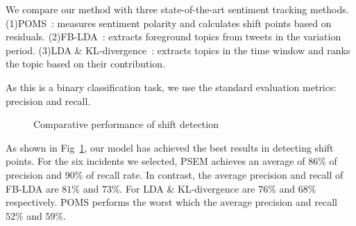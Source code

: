 \documentclass[runningheads]{llncs}
\begin{document}
We compare our method with three state-of-the-art sentiment tracking methods. (1)POMS~\cite{Bollen2011sentimentchange}: measures sentiment polarity and calculates shift points based on residuals. (2)FB-LDA~\cite{Tan2014topic}:  extracts foreground topics from tweets in the variation period. (3)LDA \& KL-divergence~\cite{Giachanou2016sentichange}: extracts topics in the time window and ranks the topic based on their contribution.

As this is a  binary classification task, we use the standard evaluation metrics:  precision and recall. 
\vspace{-0.8cm}
\begin{figure}
\centering
{}
\hspace{-4ex}
\setlength{\abovecaptionskip}{-0.1cm}
\caption{Comparative performance of shift detection}\label{fig:shift}
\end{figure}


As shown in Fig~\ref{fig:shift}, our model has achieved the best results in detecting shift points. For the six incidents we selected, PSEM achieves an average of $86\%$ of precision and $90\%$ of recall rate. In contrast, the average precision and recall of FB-LDA are $81\%$ and $73\%$. For LDA \& KL-divergence are $76\%$ and $68\%$ respectively. POMS performs the worst which the average precision and recall  $52\%$ and $59\%$. %
\end{document}
